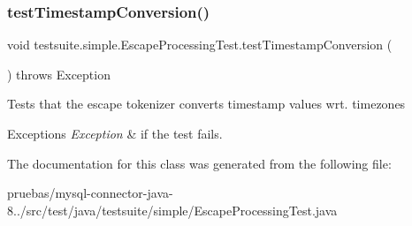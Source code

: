 \subsubsection{\texorpdfstring{test\+Timestamp\+Conversion()}{testTimestampConversion()}}
{\footnotesize\ttfamily void testsuite.\+simple.\+Escape\+Processing\+Test.\+test\+Timestamp\+Conversion (\begin{DoxyParamCaption}{ }\end{DoxyParamCaption}) throws Exception}

Tests that the escape tokenizer converts timestamp values wrt. timezones


\begin{DoxyExceptions}{Exceptions}
{\em Exception} & if the test fails. \\
\hline
\end{DoxyExceptions}


The documentation for this class was generated from the following file\+:\begin{DoxyCompactItemize}
\item 
pruebas/mysql-\/connector-\/java-\/8../src/test/java/testsuite/simple/Escape\+Processing\+Test.\+java\end{DoxyCompactItemize}
